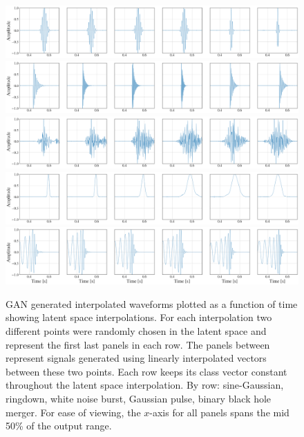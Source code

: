 \documentclass[12pt]{iopart}
\begin{document}
\begin{figure}[!h]
    \centering
    \includegraphics[width=\textwidth]{figures/generations/z_interp_sg.png}
    \includegraphics[width=\textwidth]{figures/generations/z_interp_rd.png}
    \includegraphics[width=\textwidth]{figures/generations/z_interp_wnb.png}
    \includegraphics[width=\textwidth]{figures/generations/z_interp_blip.png}
    \includegraphics[width=\textwidth]{figures/generations/z_interp_bbh.png}
    \caption{\ac{GAN} generated interpolated waveforms plotted as a function of time showing latent space interpolations. For each interpolation two different points were randomly chosen in the latent space and represent the first last panels in each row. The panels between represent signals generated using linearly interpolated vectors between these two points. Each row keeps its class vector constant throughout the latent space interpolation. By row: sine-Gaussian, ringdown, white noise burst, Gaussian pulse, binary black hole merger. For ease of viewing, the $x$-axis for all panels spans the mid 50\% of the output range.}
    \label{fig:z_interp}
\end{figure}
\end{document}

